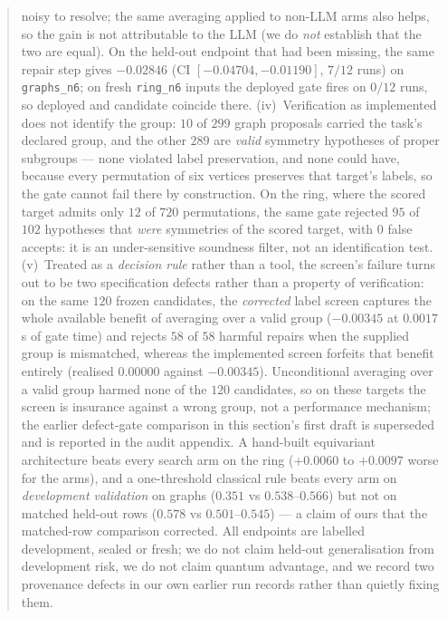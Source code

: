\documentclass{neurips_2024}
\begin{document}
\begin{abstract}
noisy to resolve; the
same averaging applied to non-LLM arms also helps, so the gain is not attributable to the
LLM (we do \emph{not} establish that the two are equal). On the held-out endpoint that had
been missing, the same repair step gives $-0.02846$ (CI $[-0.04704,-0.01190]$, $7/12$ runs)
on \texttt{graphs\_n6}; on fresh \texttt{ring\_n6} inputs the deployed gate fires on $0/12$
runs, so deployed and candidate coincide there. (iv)~Verification as implemented
does not identify the group: $10$ of $299$ graph proposals carried the task's declared
group, and the other $289$ are \emph{valid} symmetry hypotheses of proper subgroups --- none
violated label preservation, and none could have, because every permutation of six vertices
preserves that target's labels, so the gate cannot fail there by construction. On the ring,
where the scored target admits only $12$ of $720$ permutations, the same gate rejected
$95$ of $102$ hypotheses that \emph{were} symmetries of the scored target, with $0$ false
accepts: it is an under-sensitive soundness filter, not an identification test. (v)~Treated
as a \emph{decision rule} rather than a tool, the screen's failure turns out to be two
specification defects rather than a property of verification: on the same $120$ frozen
candidates, the \emph{corrected} label screen captures the whole available benefit of averaging
over a valid group ($-0.00345$ at $0.0017$\,s of gate time) and rejects $58$ of $58$ harmful
repairs when the supplied group is mismatched, whereas the implemented screen forfeits that
benefit entirely (realised $0.00000$ against $-0.00345$). Unconditional averaging over a valid
group harmed none of the $120$ candidates, so on these targets the screen is insurance against a
wrong group, not a performance mechanism; the earlier defect-gate comparison in this section's
first draft is superseded and is reported in the audit appendix. A hand-built
equivariant architecture beats every search arm on the ring
($+0.0060$ to $+0.0097$ worse for the arms), and a one-threshold classical rule beats every
arm on \emph{development validation} on graphs ($0.351$ vs $0.538$--$0.566$) but not on
matched held-out rows ($0.578$ vs $0.501$--$0.545$) --- a claim of ours that the matched-row
comparison corrected. All endpoints are labelled
development, sealed or fresh; we do not claim held-out generalisation from development
risk, we do not claim quantum advantage, and we record two provenance defects in our own
earlier run records rather than quietly fixing them.
\end{abstract}
\end{document}

